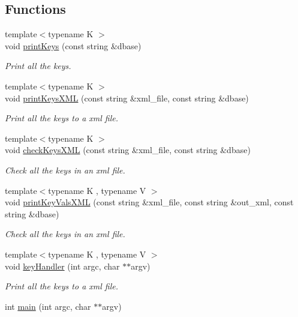 \subsection*{Functions}
\begin{DoxyCompactItemize}
\item 
{\footnotesize template$<$typename K $>$ }\\void \mbox{\hyperlink{adat-devel_2main_2dbutil_2dbdisco_8cc_a05c6483ffb9fa71112b451a5dd7eb935}{print\+Keys}} (const string \&dbase)
\begin{DoxyCompactList}\small\item\em Print all the keys. \end{DoxyCompactList}\item 
{\footnotesize template$<$typename K $>$ }\\void \mbox{\hyperlink{adat-devel_2main_2dbutil_2dbdisco_8cc_a44428d59560cb466420c5c0ca60315e5}{print\+Keys\+X\+ML}} (const string \&xml\+\_\+file, const string \&dbase)
\begin{DoxyCompactList}\small\item\em Print all the keys to a xml file. \end{DoxyCompactList}\item 
{\footnotesize template$<$typename K $>$ }\\void \mbox{\hyperlink{adat-devel_2main_2dbutil_2dbdisco_8cc_a9c4b0a95ff975fd696e640d75b7963cf}{check\+Keys\+X\+ML}} (const string \&xml\+\_\+file, const string \&dbase)
\begin{DoxyCompactList}\small\item\em Check all the keys in an xml file. \end{DoxyCompactList}\item 
{\footnotesize template$<$typename K , typename V $>$ }\\void \mbox{\hyperlink{adat-devel_2main_2dbutil_2dbdisco_8cc_a2a05b9e7e7b5e73b14c7c9fc65dd9122}{print\+Key\+Vals\+X\+ML}} (const string \&xml\+\_\+file, const string \&out\+\_\+xml, const string \&dbase)
\begin{DoxyCompactList}\small\item\em Check all the keys in an xml file. \end{DoxyCompactList}\item 
{\footnotesize template$<$typename K , typename V $>$ }\\void \mbox{\hyperlink{adat-devel_2main_2dbutil_2dbdisco_8cc_a57918e290614430413950cb4fdfd967e}{key\+Handler}} (int argc, char $\ast$$\ast$argv)
\begin{DoxyCompactList}\small\item\em Print all the keys to a xml file. \end{DoxyCompactList}\item 
int \mbox{\hyperlink{adat-devel_2main_2dbutil_2dbdisco_8cc_a3c04138a5bfe5d72780bb7e82a18e627}{main}} (int argc, char $\ast$$\ast$argv)
\end{DoxyCompactItemize}


